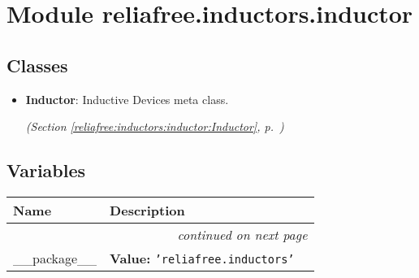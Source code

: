 %
%
%


\section{Module reliafree.inductors.inductor}

    \label{reliafree:inductors:inductor}


\subsection{Classes}

\begin{itemize}  \setlength{\parskip}{0ex}
  \item \textbf{Inductor}: Inductive Devices meta class.



  \textit{(Section \ref{reliafree:inductors:inductor:Inductor}, p.~\pageref{reliafree:inductors:inductor:Inductor})}

\end{itemize}


  \subsection{Variables}

    \vspace{-1cm}
\hspace{\varindent}\begin{longtable}{|p{\varnamewidth}|p{\vardescrwidth}|l}
\cline{1-2}
\cline{1-2} \centering \textbf{Name} & \centering \textbf{Description}& \\
\cline{1-2}
\endhead\cline{1-2}\multicolumn{3}{r}{\small\textit{continued on next page}}\\\endfoot\cline{1-2}
\endlastfoot\raggedright \_\-\_\-p\-a\-c\-k\-a\-g\-e\-\_\-\_\- & \raggedright \textbf{Value:} 
{\tt \texttt{'}\texttt{reliafree.inductors}\texttt{'}}&\\
\cline{1-2}
\end{longtable}

